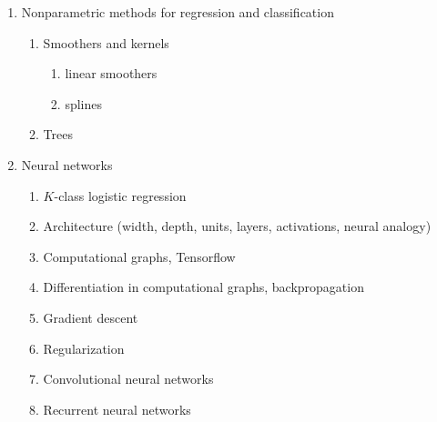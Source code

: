\documentclass{amsart}
\begin{document}
\begin{enumerate}
    \item Nonparametric methods for regression and classification
    \begin{enumerate}
        \item Smoothers and kernels
        \begin{enumerate}
            \item linear smoothers
            \item splines
        \end{enumerate}
        \item Trees
    \end{enumerate}
    \item Neural networks
    \begin{enumerate}
        \item $K$-class logistic regression
        \item Architecture (width, depth, units, layers, activations, neural analogy)
        \item Computational graphs, Tensorflow
        \item Differentiation in computational graphs, backpropagation
        \item Gradient descent
        \item Regularization
        \item Convolutional neural networks
        \item Recurrent neural networks
    \end{enumerate}
\end{enumerate}
\end{document}
